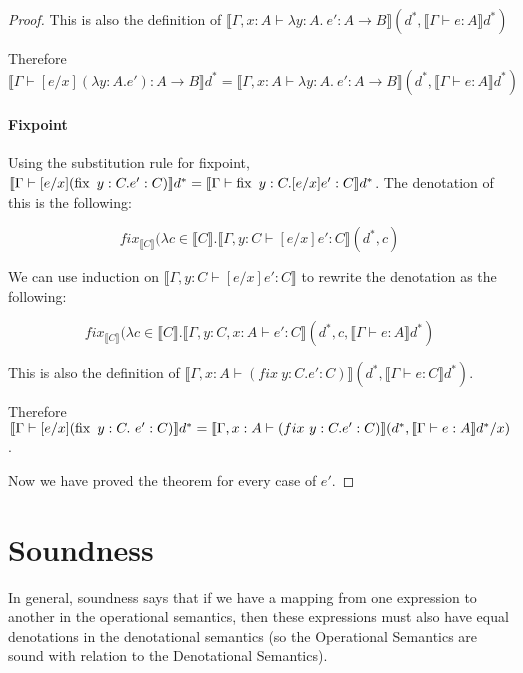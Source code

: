 \begin{proof}
This is also the definition of $\llbracket \Gamma, x : A \vdash \lambda y : A. \ e' : A \to B \rrbracket (d^*, \llbracket \Gamma \vdash e : A \rrbracket d^*)$

Therefore $\llbracket \Gamma \vdash [e/x](\lambda y : A.e') : A \to B \rrbracket d^* = \llbracket \Gamma, x : A \vdash \lambda y : A. \ e' : A \to B \rrbracket (d^*, \llbracket \Gamma \vdash e : A \rrbracket d^*)$


\paragraph{Fixpoint} Using the substitution rule for fixpoint, $\llbracket \Gamma \vdash [e/x](\operatorname{fix} \ y : C . e' : C) \rrbracket d^* = \llbracket \Gamma \vdash \operatorname{fix} \ y : C . [e/x]e' : C \rrbracket d^*$. The denotation of this is the following:

\[fix_{\llbracket C \rrbracket} (\lambda c \in \llbracket C \rrbracket . \llbracket \Gamma, y : C \vdash [e/x]e' : C \rrbracket (d^*, c)\]

 We can use induction on $\llbracket \Gamma, y : C \vdash [e/x]e' : C \rrbracket$ to rewrite the denotation as the following:

\[fix_{\llbracket C \rrbracket} (\lambda c \in \llbracket C \rrbracket . \llbracket \Gamma, y : C, x : A \vdash e' : C \rrbracket (d^*, c, \llbracket \Gamma \vdash e : A \rrbracket d^*)\] 

This is also the definition of $\llbracket \Gamma, x : A \vdash (fix \ y : C . e' : C) \rrbracket (d^*, \llbracket \Gamma \vdash e : C \rrbracket d^*)$.

\vspace{0.25cm}

Therefore $\llbracket \Gamma \vdash [e/x](\operatorname{fix} \ y : C . \ e' : C) \rrbracket d^* = \llbracket \Gamma, x : A \vdash (fix \ y : C . e' : C) \rrbracket (d^*, \llbracket \Gamma \vdash e : A \rrbracket d^* / x)$.

\vspace{0.25cm}

Now we have proved the theorem for every case of $e'$.
\end{proof}

\section{Soundness}\label{sound}
In general, soundness says that if we have a mapping from one expression to another in the operational semantics, then these expressions must also have equal denotations in the denotational semantics (so the Operational Semantics are sound with relation to the Denotational Semantics).
 

